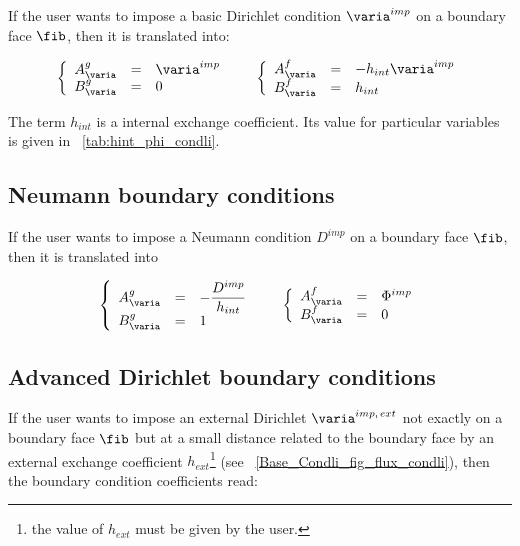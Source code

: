 If the user wants to impose a basic Dirichlet condition $\varia^{imp}$ on a boundary face $\fib$,
then it is translated into:

\begin{equation}
\begin{array}{r c l}
\left\lbrace
\begin{array}{r c l}
A^g_\varia & = &\varia^{imp} \\
B^g_\varia & = & 0
\end{array}
\right.
 & &
\left\lbrace
\begin{array}{r c l}
A^f_\varia & = & -h_{int} \varia^{imp} \\
B^f_\varia & = & h_{int}
\end{array}
\right.
\end{array}
\end{equation}

The term $h_{int}$ is a internal exchange coefficient. Its value for particular variables is 
given in \tablename~\ref{tab:hint_phi_condli}.

\subsection{Neumann boundary conditions}

If the user wants to impose a Neumann condition $D^{imp}$ on a boundary face $\fib$,
then it is translated into

\begin{equation}
\begin{array}{r c l}
\left\lbrace
\begin{array}{r c l}
A^g_\varia & = & - \dfrac{D^{imp}}{h_{int}} \\
B^g_\varia & = & 1
\end{array}
\right.
& &
\left\lbrace
\begin{array}{r c l}
A^f_\varia & = & \Phi^{imp} \\
B^f_\varia & = & 0
\end{array}
\right.
\end{array}
\end{equation}

\subsection{Advanced Dirichlet boundary conditions}
If the user wants to impose an external Dirichlet $\varia^{imp, \, ext}$ not exactly on a boundary face $\fib$ but at a small distance
related to the boundary face by an external exchange coefficient $h_{ext}$\footnote{the value of $h_{ext}$ must be given by the user.}
 (see \figurename~\ref{Base_Condli_fig_flux_condli}), then  the boundary condition coefficients read:


